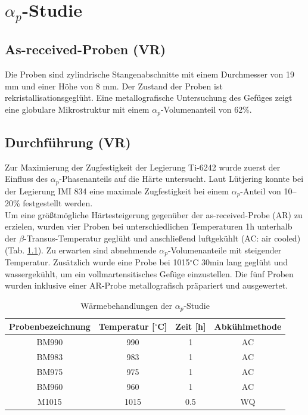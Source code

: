 \chapter{$\alpha_p$-Studie}

\section*{As-received-Proben (VR)}

Die Proben sind zylindrische Stangenabschnitte mit einem Durchmesser von 19 mm und einer Höhe von 8 mm. Der Zustand der Proben ist rekristallisationsgeglüht. Eine metallografische Untersuchung des Gefüges zeigt eine globulare Mikrostruktur mit einem $\alpha_p$-Volumenanteil von 62\%. 


\section{Durchführung (VR)}

Zur Maximierung der Zugfestigkeit der Legierung Ti-6242 wurde zuerst der Einfluss des $\alpha_p$-Phasenanteils auf die Härte untersucht. Laut Lütjering \cite{Lutjering.2007} konnte bei der Legierung IMI 834 eine maximale Zugfestigkeit bei einem $\alpha_p$-Anteil von 10--20\% festgestellt werden. \\
Um eine größtmögliche Härtesteigerung gegenüber der as-received-Probe (AR) zu erzielen, wurden vier Proben bei unterschiedlichen Temperaturen 1h unterhalb der $\beta$-Transus-Temperatur geglüht und anschließend luftgekühlt (AC: air cooled) (Tab. \ref{tab:alphap}). Zu erwarten sind abnehmende $\alpha_p$-Volumenanteile mit steigender Temperatur. Zusätzlich wurde eine Probe bei 1015$^\circ$C 30min lang geglüht und wassergekühlt, um ein vollmartensitisches Gefüge einzustellen. Die fünf Proben wurden inklusive einer AR-Probe metallografisch präpariert und ausgewertet.



\begin{table}[h]
	\centering
	\begin{tabular}{|c|c|c|c|}
		\hline 
		Probenbezeichnung & Temperatur [$^\circ$C] & Zeit [h] & Abkühlmethode \\ 
		\hline 
		BM990 & 990 & 1 & AC\\ 
		\hline 
		BM983 & 983 & 1 & AC\\
		\hline
		BM975 & 975 & 1 & AC\\ 
		\hline
		BM960 & 960 & 1 & AC\\ 
		\hline 
		M1015 & 1015 & 0.5 & WQ\\ 
		\hline
	\end{tabular} 
	\caption{Wärmebehandlungen der $\alpha_p$-Studie}
	\label{tab:alphap}
\end{table}



